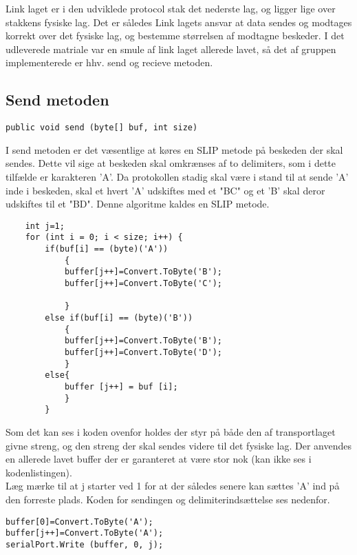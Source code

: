 Link laget er i den udviklede protocol stak det nederste lag, og ligger lige over stakkens fysiske lag. Det er således Link lagets ansvar at data sendes og modtages korrekt over det fysiske lag, og bestemme størrelsen af modtagne beskeder. I det udleverede matriale var en smule af link laget allerede lavet, så det af gruppen implementerede er hhv. send og recieve metoden.

\subsection{Send metoden}

\begin{verbatim}
public void send (byte[] buf, int size)
\end{verbatim}

I send metoden er det væsentlige at køres en SLIP metode på beskeden der skal sendes. Dette vil sige at beskeden skal omkrænses af to delimiters, som i dette tilfælde er karakteren 'A'. Da protokollen stadig skal være i stand til at sende 'A' inde i beskeden, skal et hvert 'A' udskiftes med et "BC" og et 'B' skal deror udskiftes til et "BD". Denne algoritme kaldes en SLIP metode.


\begin{lstlisting}
	int j=1;
	for (int i = 0; i < size; i++) {
		if(buf[i] == (byte)('A'))
			{
			buffer[j++]=Convert.ToByte('B');
			buffer[j++]=Convert.ToByte('C');

			}
		else if(buf[i] == (byte)('B'))
			{
			buffer[j++]=Convert.ToByte('B');
			buffer[j++]=Convert.ToByte('D');
			}
		else{
			buffer [j++] = buf [i];
			}
		}
\end{lstlisting}

Som det kan ses i koden ovenfor holdes der styr på både den af transportlaget givne streng, og den streng der skal sendes videre til det fysiske lag. Der anvendes en allerede lavet buffer der er garanteret at være stor nok (kan ikke ses i kodenlistingen).\\

\noindent Læg mærke til at j starter ved 1 for at der således senere kan sættes 'A' ind på den forreste plads. Koden for sendingen og delimiterindsættelse ses nedenfor.

\begin{verbatim}
buffer[0]=Convert.ToByte('A');
buffer[j++]=Convert.ToByte('A');
serialPort.Write (buffer, 0, j);
\end{verbatim}

